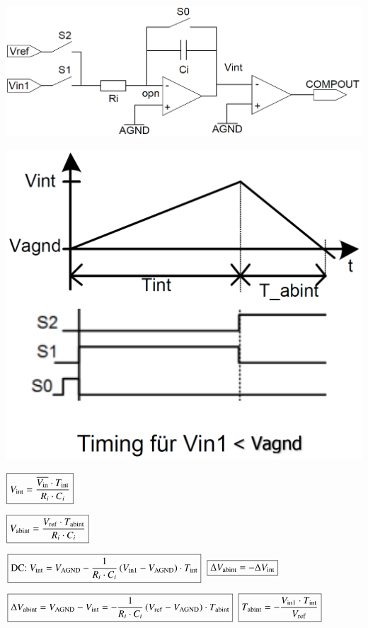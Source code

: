 \begin{minipage}{0.42\linewidth}
    \includegraphics[width=\linewidth]{images/dual_slope_ADC}
\end{minipage}
\begin{minipage}{0.27\linewidth}
    \includegraphics[width=0.83\linewidth]{images//dual_slope_ADC_timing}
\end{minipage}
    \hfill
\begin{minipage}{0.29\linewidth}
    \centering
    $ \boxed{  V_{\rm int} = \frac{\overline{V_{\rm in}} \cdot T_{\rm int}}{R_i \cdot C_i} } $

    $ \boxed{  V_{\rm abint} = \frac{V_{\rm ref} \cdot T_{\rm abint}}{R_i \cdot C_i}  } $ 
\end{minipage}
    
$ \boxed{ \text{DC: } V_{\rm int} = V_{\rm AGND}- \frac{1}{R_i \cdot C_i} \, (V_{\rm in1}- V_{\rm AGND}) \cdot T_{\rm int} } $ 
\quad $\boxed{ \Delta V_{\rm abint} = - \Delta V_{\rm int} }$

$ \boxed{ \Delta V_{\rm abint} = V_{\rm AGND} - V_{\rm int} = - \frac{1}{R_i \cdot C_i} \, (V_{\rm ref} - V_{\rm AGND}) \cdot T_{\rm abint} }$ 
\quad $\boxed{ T_{\rm abint} = - \frac{V_{\rm in1} \cdot T_{\rm int}}{V_{\rm ref}} }$
  
